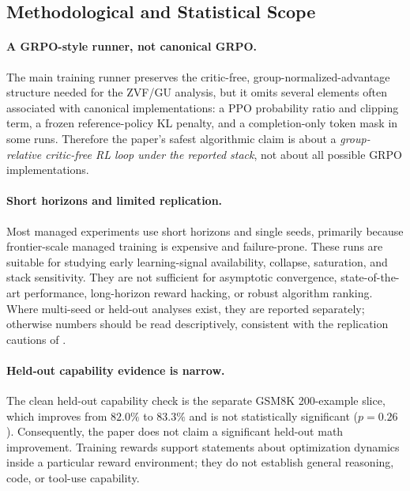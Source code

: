 \documentclass{article}
\begin{document}
\subsection{Methodological and Statistical Scope}
\label{sec:method_limits}

\paragraph{A GRPO-style runner, not canonical GRPO.}
The main training runner preserves the critic-free, group-normalized-advantage
structure needed for the ZVF/GU analysis, but it omits several elements often
associated with canonical implementations: a PPO probability ratio and clipping
term, a frozen reference-policy KL penalty, and a completion-only token mask in
some runs.  Therefore the paper's safest algorithmic claim is about a
\emph{group-relative critic-free RL loop under the reported stack}, not about all
possible GRPO implementations.

\paragraph{Short horizons and limited replication.}
Most managed experiments use short horizons and single seeds, primarily because
frontier-scale managed training is expensive and failure-prone.  These runs are
suitable for studying early learning-signal availability, collapse, saturation,
and stack sensitivity.  They are not sufficient for asymptotic convergence,
state-of-the-art performance, long-horizon reward hacking, or robust algorithm
ranking.  Where multi-seed or held-out analyses exist, they are reported
separately; otherwise numbers should be read descriptively, consistent with the
replication cautions of \citet{henderson2018deep}.

\paragraph{Held-out capability evidence is narrow.}
The clean held-out capability check is the separate GSM8K 200-example slice,
which improves from $82.0\%$ to $83.3\%$ and is not statistically significant
($p=0.26$).  Consequently, the paper does not claim a significant held-out math
improvement.  Training rewards support statements about optimization dynamics
inside a particular reward environment; they do not establish general reasoning,
code, or tool-use capability.
\end{document}
